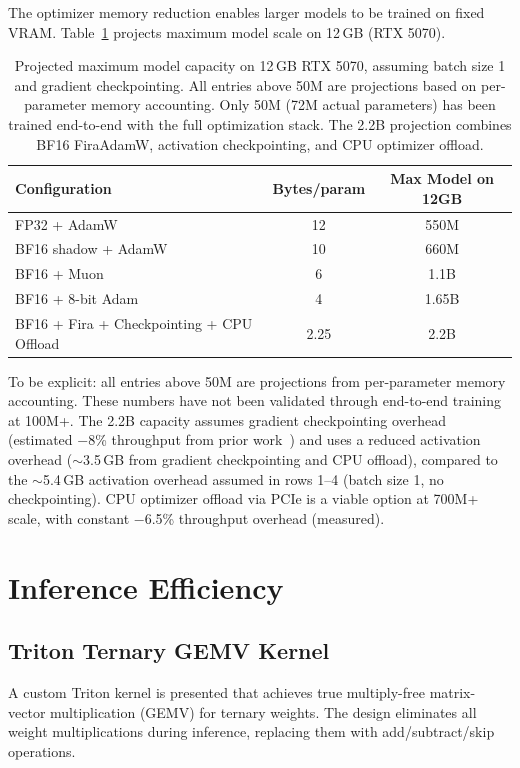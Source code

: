 \documentclass{article}
\begin{document}
The optimizer memory reduction enables larger models to be trained on fixed VRAM. Table~\ref{tab:capacity} projects maximum model scale on 12\,GB (RTX 5070).

\begin{table}[t]
\centering
\small
\caption{Projected maximum model capacity on 12\,GB RTX 5070, assuming batch size 1 and gradient checkpointing. All entries above 50M are projections based on per-parameter memory accounting. Only 50M (72M actual parameters) has been trained end-to-end with the full optimization stack. The 2.2B projection combines BF16 FiraAdamW, activation checkpointing, and CPU optimizer offload.}
\label{tab:capacity}
\begin{tabular}{lcc}
\toprule
\textbf{Configuration} & \textbf{Bytes/param} & \textbf{Max Model on 12GB} \\
\midrule
FP32 + AdamW & 12 & 550M \\
BF16 shadow + AdamW & 10 & 660M \\
BF16 + Muon & 6 & 1.1B \\
BF16 + 8-bit Adam & 4 & 1.65B \\
BF16 + Fira + Checkpointing + CPU Offload & 2.25 & 2.2B \\
\bottomrule
\end{tabular}
\end{table}

To be explicit: all entries above 50M are projections from per-parameter memory accounting. These numbers have not been validated through end-to-end training at 100M+. The 2.2B capacity assumes gradient checkpointing overhead (estimated $-$8\% throughput from prior work~\citep{chen2016training}) and uses a reduced activation overhead ($\sim$3.5\,GB from gradient checkpointing and CPU offload), compared to the $\sim$5.4\,GB activation overhead assumed in rows 1--4 (batch size 1, no checkpointing). CPU optimizer offload via PCIe is a viable option at 700M+ scale, with constant $-$6.5\% throughput overhead (measured).

\section{Inference Efficiency}

\subsection{Triton Ternary GEMV Kernel}

A custom Triton kernel is presented that achieves true multiply-free matrix-vector multiplication (GEMV) for ternary weights. The design eliminates all weight multiplications during inference, replacing them with add/subtract/skip operations.
\end{document}
